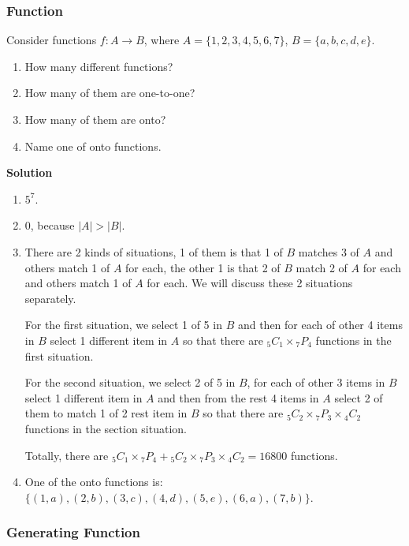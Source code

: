 \documentclass[10pt, compress]{beamer}
\begin{document}
\begin{frame}[allowframebreaks]
\frametitle{Function}
Consider functions $f \colon A \rightarrow B$, where $A = \{1, 2, 3, 4, 5, 6, 7\}$, $B = \{a, b, c, d, e\}$.\begin{enumerate}
	\item How many different functions?
	\item How many of them are one-to-one?
	\item How many of them are onto?
	\item Name one of onto functions.
\end{enumerate}
\textbf{Solution} \begin{enumerate}
	\item $5^7$.
	\item $0$, because $|A| > |B|$.
	\item There are 2 kinds of situations, 1 of them is that 1 of $B$ matches 3 of $A$ and others match 1 of $A$ for each, the other 1 is that 2 of $B$ match 2 of $A$ for each and others match 1 of $A$ for each. We will discuss these 2 situations separately.
	
	For the first situation, we select 1 of 5 in $B$ and then for each of other 4 items in $B$ select 1 different item in $A$ so that there are ${}_5 C_1 \times {}_7 P_4$ functions in the first situation.
	
	For the second situation, we select 2 of 5 in $B$, for each of other 3 items in $B$ select 1 different item in $A$ and then from the rest 4 items in $A$ select 2 of them to match 1 of 2 rest item in $B$ so that there are ${}_5 C_2 \times {}_7 P_3 \times {}_4 C_2$ functions in the section situation.
	
	Totally, there are ${}_5 C_1 \times {}_7 P_4 + {}_5 C_2 \times {}_7 P_3 \times {}_4 C_2 = 16800$ functions.
	
	\item One of the onto functions is: $\{(1, a), (2, b), (3, c), (4, d), (5, e), (6, a), (7, b)\}$.
\end{enumerate}
\end{frame}

\begin{frame}[fragile]
\frametitle{Generating Function}

\end{frame}

\end{document}
